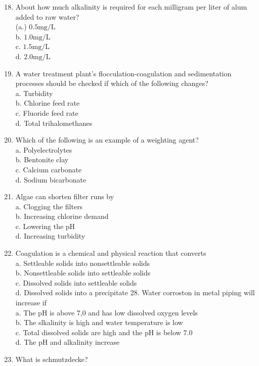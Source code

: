 \documentclass[10pt]{article}
\begin{document}
\begin{enumerate}
  \setcounter{enumi}{17}
  \item About how much alkalinity is required for each milligram per liter of alum added to raw water?\\
(a.) $0.5 \mathrm{mg} / \mathrm{L}$\\
b. $1.0 \mathrm{mg} / \mathrm{L}$\\
c. $1.5 \mathrm{mg} / \mathrm{L}$\\
d. $2.0 \mathrm{mg} / \mathrm{L}$

  \item A water treatment plant's flocculation-coagulation and sedimentation processes should be checked if which of the following changes?\\
a. Turbidity\\
b. Chlorine feed rate\\
c. Fluoride feed rate\\
d. Total trihalomethanes

  \item Which of the following is an example of a weighting agent?\\
a. Polyelectrolytes\\
b. Bentonite clay\\
c. Calcium carbonate\\
d. Sodium bicarbonate

  \item Algae can shorten filter runs by\\
a. Clogging the filters\\
b. Increasing chlorine demand\\
c. Lowering the $\mathrm{pH}$\\
d. Increasing turbidity

  \item Coagulation is a chemical and physical reaction that converts\\
a. Settleable solids into nonsettleable solids\\
b. Nonsettleable solids into settleable solids\\
c. Dissolved solids into settleable solids\\
d. Dissolved solids into a precipitate 28. Water corroston in metal piping will increase if\\
a. The pH is above 7,0 and has low dissolved oxygen levels\\
b. The slkalinity is high and water temperature is low\\
c. Total dissolved solids are high and the $\mathrm{pH}$ is below $7.0$\\
d. The $\mathrm{pH}$ and alkalinity increase

  \item What is schmutzdecke?

\end{enumerate}
\end{document}
